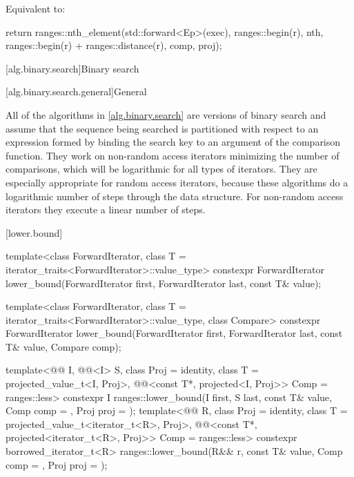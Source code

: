 \begin{itemdescr}
\pnum
\effects
Equivalent to:
\begin{codeblock}
return ranges::nth_element(std::forward<Ep>(exec), ranges::begin(r), nth,
                           ranges::begin(r) + ranges::distance(r),
                           comp, proj);
\end{codeblock}
\end{itemdescr}

[alg.binary.search]{Binary search}

[alg.binary.search.general]{General}

\pnum
All of the algorithms in \ref{alg.binary.search} are versions of binary search and
assume that the sequence being searched
is partitioned with respect to an expression
formed by binding the search key to an argument of the comparison function.
They work on non-random access iterators minimizing the number of comparisons,
which will be logarithmic for all types of iterators.
They are especially appropriate for random access iterators,
because these algorithms do a logarithmic number of steps
through the data structure.
For non-random access iterators they execute a linear number of steps.

[lower.bound]{}

%
\begin{itemdecl}
template<class ForwardIterator, class T = iterator_traits<ForwardIterator>::value_type>
  constexpr ForwardIterator
    lower_bound(ForwardIterator first, ForwardIterator last,
                const T& value);

template<class ForwardIterator, class T = iterator_traits<ForwardIterator>::value_type,
         class Compare>
  constexpr ForwardIterator
    lower_bound(ForwardIterator first, ForwardIterator last,
                const T& value, Compare comp);

template<@@ I, @@<I> S, class Proj = identity,
         class T = projected_value_t<I, Proj>,
         @@<const T*, projected<I, Proj>> Comp = ranges::less>
  constexpr I ranges::lower_bound(I first, S last, const T& value, Comp comp = {},
                                  Proj proj = {});
template<@@ R, class Proj = identity,
         class T = projected_value_t<iterator_t<R>, Proj>,
         @@<const T*, projected<iterator_t<R>, Proj>> Comp =
           ranges::less>
  constexpr borrowed_iterator_t<R>
    ranges::lower_bound(R&& r, const T& value, Comp comp = {}, Proj proj = {});
\end{itemdecl}

